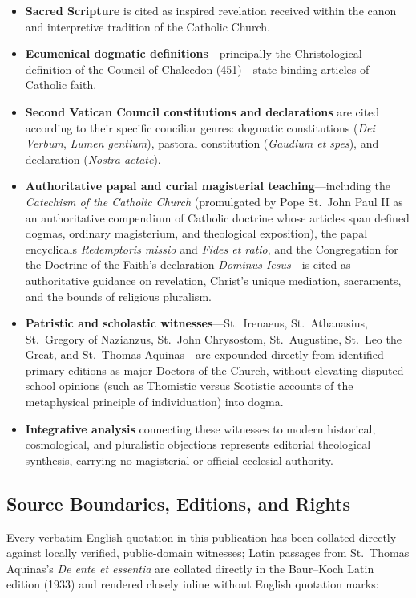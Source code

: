 \begin{itemize}
\item \textbf{Sacred Scripture} is cited as inspired revelation received within the canon and interpretive tradition of the Catholic Church.
\item \textbf{Ecumenical dogmatic definitions}---principally the Christological definition of the Council of Chalcedon (451)---state binding articles of Catholic faith.
\item \textbf{Second Vatican Council constitutions and declarations} are cited according to their specific conciliar genres: dogmatic constitutions (\textit{Dei Verbum}, \textit{Lumen gentium}), pastoral constitution (\textit{Gaudium et spes}), and declaration (\textit{Nostra aetate}).
\item \textbf{Authoritative papal and curial magisterial teaching}---including the \textit{Catechism of the Catholic Church} (promulgated by Pope St.\ John Paul II as an authoritative compendium of Catholic doctrine whose articles span defined dogmas, ordinary magisterium, and theological exposition), the papal encyclicals \textit{Redemptoris missio} and \textit{Fides et ratio}, and the Congregation for the Doctrine of the Faith's declaration \textit{Dominus Iesus}---is cited as authoritative guidance on revelation, Christ's unique mediation, sacraments, and the bounds of religious pluralism.
\item \textbf{Patristic and scholastic witnesses}---St.\ Irenaeus, St.\ Athanasius, St.\ Gregory of Nazianzus, St.\ John Chrysostom, St.\ Augustine, St.\ Leo the Great, and St.\ Thomas Aquinas---are expounded directly from identified primary editions as major Doctors of the Church, without elevating disputed school opinions (such as Thomistic versus Scotistic accounts of the metaphysical principle of individuation) into dogma.
\item \textbf{Integrative analysis} connecting these witnesses to modern historical, cosmological, and pluralistic objections represents editorial theological synthesis, carrying no magisterial or official ecclesial authority.
\end{itemize}

\subsection*{Source Boundaries, Editions, and Rights}

Every verbatim English quotation in this publication has been collated directly against locally verified, public-domain witnesses; Latin passages from St.\ Thomas Aquinas's \textit{De ente et essentia} are collated directly in the Baur--Koch Latin edition (1933) and rendered closely inline without English quotation marks:

